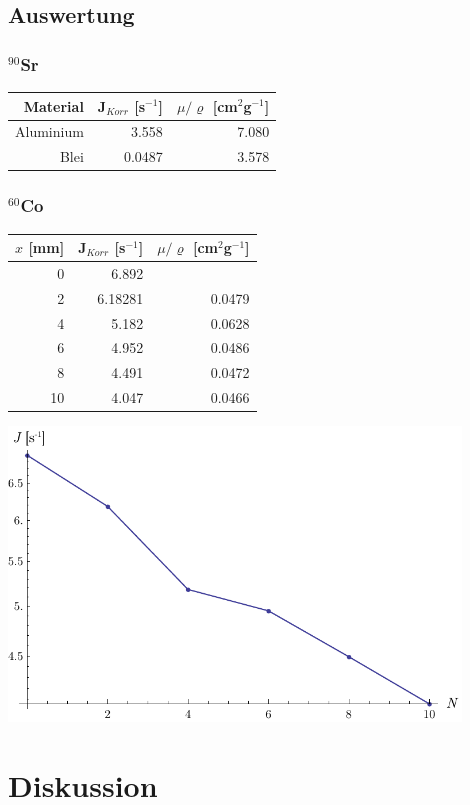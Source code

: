 \documentclass[12pt,a4paper]{article}
\begin{document}
\subsection*{Auswertung}
\subsubsection*{${}^{90}$Sr}
\begin{tabular}{|r|r|r|}
\hline
Material&J$_{Korr}$ [s$^{-1}$]&$\mu /\varrho $ [cm${}^2$g${}^{-1}$]\\
\hline
Aluminium&3.558&7.080\\
Blei&0.0487&3.578\\
\hline
\end{tabular}

\subsubsection*{${}^{60}$Co}
\begin{tabular}{|r|r|r|}
\hline
$x$ [mm]&J$_{Korr}$ [s$^{-1}$]&$\mu /\varrho $ [cm${}^2$g${}^{-1}$]\\
\hline
0&6.892&\\
2&6.18281&0.0479\\
4&5.182&0.0628\\
6&4.952&0.0486\\
8&4.491&0.0472\\
10&4.047&0.0466\\
\hline
\end{tabular}
\begin{center}
\includegraphics[width=12cm]{diagram4.pdf}
\end{center}

\section*{Diskussion}
\end{document}
